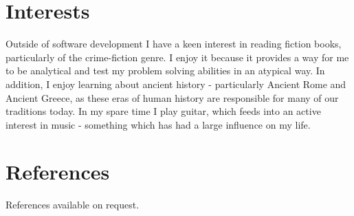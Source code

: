 \documentclass[1pt]{article}
\begin{document}
\section*{Interests}
Outside of software development I have a keen interest in reading fiction books, particularly of the crime-fiction genre. I enjoy it because it provides a way for me to be analytical and test my problem solving abilities in an atypical way. In addition, I enjoy learning about ancient history - particularly Ancient Rome and Ancient Greece, as these eras of human history are responsible for many of our traditions today. In my spare time I play guitar, which feeds into an active interest in music - something which has had a large influence on my life.


\section*{References}
References available on request.

\end{document}
